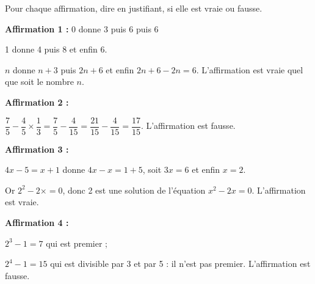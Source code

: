 
\medskip

Pour chaque affirmation, dire en justifiant, si elle est vraie ou fausse.

\bigskip

\textbf{Affirmation 1 :} 0 donne  3 puis 6  puis 6

1 donne 4 puis 8  et enfin 6.

$n$ donne $n + 3$ puis $2n + 6$ et enfin $2n + 6 - 2n = 6$. L'affirmation est vraie quel que soit le nombre $n$.

\textbf{Affirmation 2 :}

$\dfrac{7}{5} - \dfrac{4}{5} \times \dfrac{1}{3} = \dfrac{7}{5} - \dfrac{4}{15}  = \dfrac{21}{15} - \dfrac{4}{15} = \dfrac{17}{15}$. L'affirmation est fausse.

\textbf{Affirmation 3 :}

$4x - 5 = x + 1$ donne $4x - x = 1 + 5$, soit $3x = 6$ et enfin $x = 2$.

Or $2^2 - 2\times = 0$, donc 2 est une solution de l'équation $x^2 - 2x = 0$. L'affirmation est vraie.

\textbf{Affirmation 4 :}

$2^3 - 1 = 7$ qui est premier ;

$2^4 - 1 = 15$ qui est divisible par 3 et par 5  : il n'est pas premier. L'affirmation est fausse.

\vspace{0,5cm}


